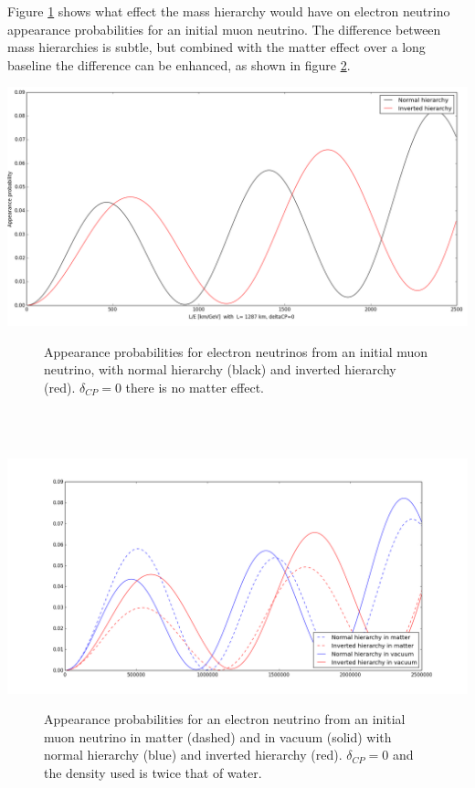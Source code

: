 \documentclass[12pt]{article}
\begin{document}
Figure \ref{fig:MH} shows what effect the mass hierarchy would have on electron neutrino appearance probabilities for an initial muon neutrino. The difference between mass hierarchies is subtle, but combined with the matter effect over a long baseline the difference can be enhanced, as shown in figure \ref{fig:MHinmatter}.
\begin{center}
\includegraphics[scale=0.4]{hierarchy_effect.png}
\begin{figure}[h!]
\caption{Appearance probabilities for electron neutrinos from an initial muon neutrino, with normal hierarchy (black) and inverted hierarchy (red). $\delta_{CP}=0$ there is no matter effect.}
\label{fig:MH}
\end{figure}
\end{center}\\\\
\begin{center}
\includegraphics[scale=0.4]{MH_in_matter.png}
\begin{figure}[h!]
\caption{Appearance probabilities for an electron neutrino from an initial muon neutrino in matter (dashed) and in vacuum (solid) with normal hierarchy (blue) and inverted hierarchy (red). $\delta_{CP}=0$ and the density used is twice that of water.}
\label{fig:MHinmatter}
\end{figure}
\end{center}
\end{document}
